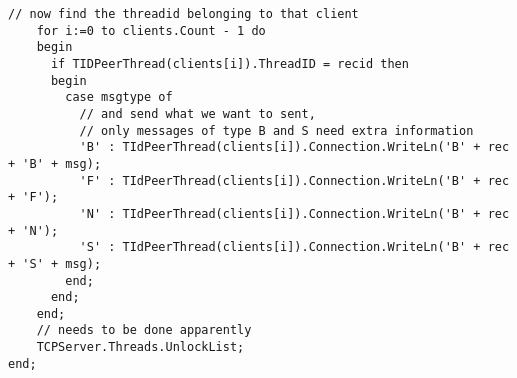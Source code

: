 \documentclass{article}
\begin{document}
\begin{lstlisting}[basicstyle=\footnotesize]
    // now find the threadid belonging to that client
    for i:=0 to clients.Count - 1 do
    begin
      if TIDPeerThread(clients[i]).ThreadID = recid then
      begin
        case msgtype of
          // and send what we want to sent,
          // only messages of type B and S need extra information
          'B' : TIdPeerThread(clients[i]).Connection.WriteLn('B' + rec + 'B' + msg);
          'F' : TIdPeerThread(clients[i]).Connection.WriteLn('B' + rec + 'F');
          'N' : TIdPeerThread(clients[i]).Connection.WriteLn('B' + rec + 'N');
          'S' : TIdPeerThread(clients[i]).Connection.WriteLn('B' + rec + 'S' + msg);
        end;
      end;
    end;
    // needs to be done apparently
    TCPServer.Threads.UnlockList;
end;
\end{lstlisting}
\end{document}
